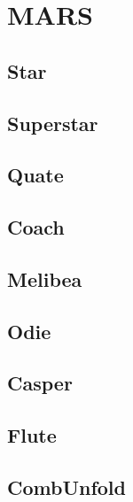\section{MARS}%
\label{sec:mars}

\subsection{Star}%
\label{sub:star}

\subsection{Superstar}%
\label{sub:superstar}

\subsection{Quate}%
\label{sub:quate}

\subsection{Coach}%
\label{sub:coach}

\subsection{Melibea}%
\label{sub:melibea}

\subsection{Odie}%
\label{sub:odie}

\subsection{Casper}%
\label{sub:casper}

\subsection{Flute}%
\label{sub:flute}

\subsection{CombUnfold}%
\label{sub:combunfold}
